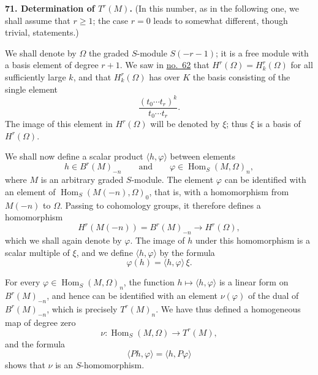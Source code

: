 
\label{fac:III:4:no:71}
\textbf{71. Determination of $T^r(M)$.}
(In this number, as in the following one, we shall assume that $r\geq1$;
the case $r=0$ leads to somewhat different, though trivial, statements.)

\label{fac:III:4:no:71:def:Omega}
We shall denote by $\Omega$ the graded $S$-module $S(-r-1)$; it is a
free module with a basis element of degree $r+1$. We saw in
\hyperref[fac:III:3:no:62]{no.~62} that $H^r(\Omega)=H_k^r(\Omega)$ for
all sufficiently large $k$, and that $H_k^r(\Omega)$ has over $K$ the
basis consisting of the single element
\label{fac:III:4:no:71:formula:xi-basis}
\[
\frac{(t_0\cdots t_r)^k}{t_0\cdots t_r}.
\]
The image of this element in $H^r(\Omega)$ will be denoted by $\xi$;
thus $\xi$ is a basis of $H^r(\Omega)$.

We shall now define a scalar product $\langle h,\varphi\rangle$ between
elements
\[
h\in B^r(M)_{-n}
\qquad\text{and}\qquad
\varphi\in\operatorname{Hom}_S(M,\Omega)_n,
\]
where $M$ is an arbitrary graded $S$-module. The element $\varphi$ can
be identified with an element of
$\operatorname{Hom}_S(M(-n),\Omega)_0$, that is, with a homomorphism
from $M(-n)$ to $\Omega$. Passing to cohomology groups, it therefore
defines a homomorphism
\[
H^r(M(-n))=B^r(M)_{-n}\longrightarrow H^r(\Omega),
\]
which we shall again denote by $\varphi$. The image of $h$ under this
homomorphism is a scalar multiple of $\xi$, and we define
$\langle h,\varphi\rangle$ by the formula
\label{fac:III:4:no:71:formula:pairing}
\[
\varphi(h)=\langle h,\varphi\rangle\,\xi.
\]

For every $\varphi\in\operatorname{Hom}_S(M,\Omega)_n$, the function
$h\mapsto\langle h,\varphi\rangle$ is a linear form on
$B^r(M)_{-n}$, and hence can be identified with an element
$\nu(\varphi)$ of the dual of $B^r(M)_{-n}$, which is precisely
$T^r(M)_n$. We have thus defined a homogeneous map of degree zero
\label{fac:III:4:no:71:map:nu}
\[
\nu:\operatorname{Hom}_S(M,\Omega)\longrightarrow T^r(M),
\]
and the formula
\label{fac:III:4:no:71:formula:S-linearity}
\[
\langle Ph,\varphi\rangle=\langle h,P\varphi\rangle
\]
shows that $\nu$ is an $S$-homomorphism.


